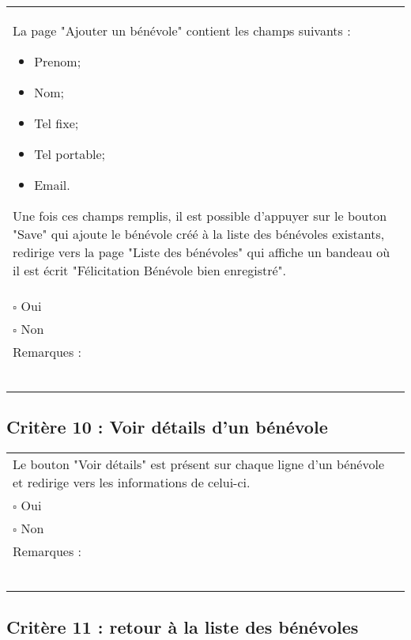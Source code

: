 	\begin{center}
    	 		\begin{tabular}[h]{|p{}|}
			\hline
				La page "Ajouter un bénévole"  contient les champs suivants : 
				\begin{itemize}
					\item Prenom;
					\item Nom;
					\item Tel fixe;
					\item Tel portable;
					\item Email.
				\end{itemize}
				Une fois ces champs remplis, il est possible d'appuyer sur le bouton "Save" qui ajoute le bénévole créé à la liste des bénévoles existants, redirige vers la page "Liste des bénévoles" qui affiche un bandeau où il est écrit "Félicitation Bénévole bien enregistré". \\
				$\square$ Oui  \\ $\square$ Non \\\hline Remarques : \\ ~\\
			 \\\hline
     		\end{tabular}
  		\end{center}	
  		
  		
  		\subsection*{Critère 10 : Voir détails d'un bénévole}
	
	\begin{center}
    	 		\begin{tabular}[h]{|p{}|}
			\hline
				Le bouton "Voir détails" est présent sur chaque ligne d'un bénévole et redirige vers les informations de celui-ci.\\
				$\square$ Oui  \\ $\square$ Non \\\hline Remarques : \\ ~\\
			 \\\hline
     		\end{tabular}
  		\end{center}	
  		
  		
  		\subsection*{Critère 11 : retour à la liste des bénévoles}
	
